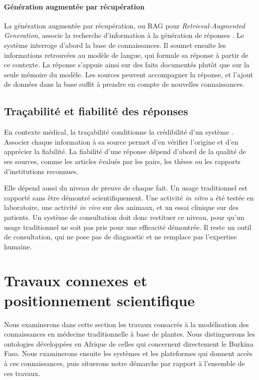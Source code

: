 \paragraph{Génération augmentée par récupération}
La génération augmentée par récupération, ou RAG pour \textit{Retrieval-Augmented Generation}, associe la recherche d'information à la génération de réponses \cite{lewis2020rag}. Le système interroge d'abord la base de connaissances. Il soumet ensuite les informations retrouvées au modèle de langue, qui formule sa réponse à partir de ce contexte. La réponse s'appuie ainsi sur des faits documentés plutôt que sur la seule mémoire du modèle. Les sources peuvent accompagner la réponse, et l'ajout de données dans la base suffit à prendre en compte de nouvelles connaissances.

\subsection{Traçabilité et fiabilité des réponses}
\label{subsec:tracabilite_fiabilite}

En contexte médical, la traçabilité conditionne la crédibilité d'un système \cite{floridi2018ai4people}. Associer chaque information à sa source permet d'en vérifier l'origine et d'en apprécier la fiabilité. La fiabilité d'une réponse dépend d'abord de la qualité de ses sources, comme les articles évalués par les pairs, les thèses ou les rapports d'institutions reconnues.

Elle dépend aussi du niveau de preuve de chaque fait. Un usage traditionnel est rapporté sans être démontré scientifiquement. Une activité \textit{in vitro} a été testée en laboratoire, une activité \textit{in vivo} sur des animaux, et un essai clinique sur des patients. Un système de consultation doit donc restituer ce niveau, pour qu'un usage traditionnel ne soit pas pris pour une efficacité démontrée. Il reste un outil de consultation, qui ne pose pas de diagnostic et ne remplace pas l'expertise humaine.

\section{Travaux connexes et positionnement scientifique}
\label{sec:travaux_connexes}

Nous examinerons dans cette section les travaux consacrés à la modélisation des connaissances en médecine traditionnelle à base de plantes. Nous distinguerons les ontologies développées en Afrique de celles qui concernent directement le Burkina Faso. Nous examinerons ensuite les systèmes et les plateformes qui donnent accès à ces connaissances, puis situerons notre démarche par rapport à l'ensemble de ces travaux.


